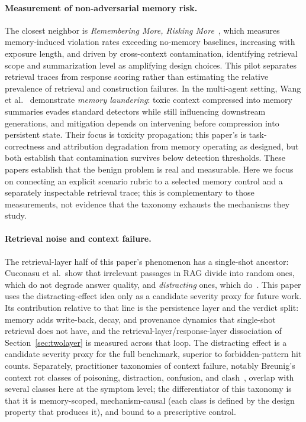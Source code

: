 \documentclass[11pt]{article}
\begin{document}
\paragraph{Measurement of non-adversarial memory risk.}
The closest neighbor is \emph{Remembering More, Risking
More}~\cite{altawaha2026remembering}, which measures memory-induced
violation rates exceeding no-memory baselines, increasing with exposure
length, and driven by cross-context contamination, identifying retrieval
scope and summarization level as amplifying design choices. This pilot
separates retrieval traces from response scoring rather than estimating the
relative prevalence of retrieval and construction failures. In the multi-agent setting, Wang et
al.~\cite{wang2026state} demonstrate \emph{memory laundering}: toxic
context compressed into memory summaries evades standard detectors while
still influencing downstream generations, and mitigation depends on
intervening before compression into persistent state. Their focus is
toxicity propagation; this paper's is task-correctness and attribution
degradation from memory operating as designed, but both establish that
contamination survives below detection thresholds. These papers establish
that the benign problem is real and measurable. Here we focus on connecting
an explicit scenario rubric to a selected memory control and a separately
inspectable retrieval trace; this is complementary to those measurements,
not evidence that the taxonomy exhausts the mechanisms they study.

\paragraph{Retrieval noise and context failure.}
The retrieval-layer half of this paper's phenomenon has a single-shot
ancestor: Cuconasu et al.\ show that irrelevant passages in RAG divide
into random ones, which do not degrade answer quality, and
\emph{distracting} ones, which do~\cite{cuconasu2024power}. This paper uses
the distracting-effect idea only as a candidate severity proxy for future
work. Its contribution relative to that line is the
persistence layer and the verdict split: memory adds write-back, decay,
and provenance dynamics that single-shot retrieval does not have, and
the retrieval-layer/response-layer dissociation of
Section~\ref{sec:twolayer} is measured across that loop. The distracting
effect is a candidate severity proxy for the full benchmark, superior to
forbidden-pattern hit counts. Separately, practitioner taxonomies of
context failure, notably Breunig's context rot classes of poisoning,
distraction, confusion, and clash~\cite{breunig2025context}, overlap
with several classes here at the symptom level; the differentiator of
this taxonomy is that it is memory-scoped, mechanism-causal (each class
is defined by the design property that produces it), and bound to a
prescriptive control.
\end{document}
